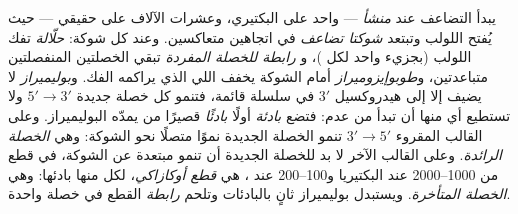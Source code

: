 \begin{definition}\label{def:b1:replication-mitosis:fork}
يبدأ التضاعف عند \emph{منشأ} --- واحد على  البكتيري، وعشرات
الآلاف على  حقيقي  --- حيث يُفتح اللولب وتبتعد
\emph{شوكتا تضاعف} في اتجاهين متعاكسين. وعند كل شوكة: \emph{حلّالة}
تفك اللولب (بجزيء  واحد لكل )، و\emph{ رابطة للخصلة
المفردة} تبقي الخصلتين المنفصلتين متباعدتين،
و\emph{طوبوإيزوميراز} أمام الشوكة يخفف اللي الذي يراكمه الفك.
و\emph{بوليميراز } لا يضيف  إلا إلى هيدروكسيل $3'$
في سلسلة قائمة، فتنمو كل خصلة جديدة $5' \to 3'$ ولا تستطيع أي منها
أن تبدأ من عدم: فتضع \emph{بادئة} أولًا \emph{بادئًا} قصيرًا من 
يمدّه البوليميراز. وعلى القالب المقروء $3' \to 5'$ تنمو الخصلة الجديدة
نموًا متصلًا نحو الشوكة: وهي \emph{الخصلة الرائدة}. وعلى القالب الآخر
لا بد للخصلة الجديدة أن تنمو مبتعدة عن الشوكة، في قطع من
\qtyrange{1000}{2000}{}  عند البكتيريا و\qtyrange{100}{200}{}
عند ، هي \emph{قطع أوكازاكي}، لكل منها بادئها: وهي
\emph{الخصلة المتأخرة}. ويستبدل بوليميراز ثانٍ بالبادئات  وتلحم
\emph{رابطة} القطع في خصلة واحدة.
\end{definition}

